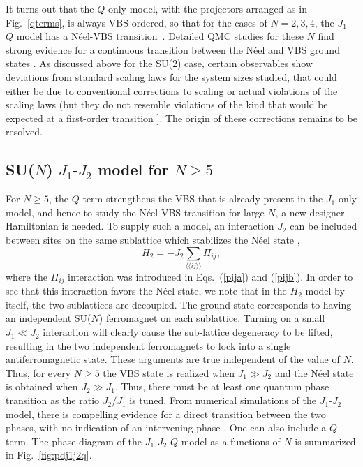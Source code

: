 \documentclass[range]{ar2e}
\begin{document}
It turns out that the $Q$-only model, with the projectors arranged as in Fig.~\ref{qterms}, is always VBS ordered, so that for the cases of $N=2,3,4$, 
the $J_1$-$Q$ model has a N\'eel-VBS transition~\cite{Sandvik07,lou2009:sun}. Detailed QMC studies for these $N$ find strong evidence for a 
continuous transition between the N\'eel and VBS ground states \cite{melko2008:jq,kaul2011:su34,banerjee2010:log,banerjee2010:su3}. 
As discussed above for the SU($2$) case, certain observables show deviations from standard scaling laws for the system sizes studied, that could either 
be due to conventional corrections to scaling or actual violations of the scaling laws (but they do not resemble violations of the kind that would be 
expected at a first-order transition \cite{Sandvik10c}]. The origin of these corrections remains to be resolved.

\subsection{SU($N$) $J_1$-$J_2$ model for $N\geq 5$}
\label{ss:j1j2N}

For $N\geq 5$, the $Q$ term strengthens the VBS that is already present in the $J_1$ only model, and hence to study the N\'eel-VBS transition 
for large-$N$, a new designer Hamiltonian is needed. To supply such a model, an interaction $J_2$ can be included between sites on the same sublattice 
which stabilizes the N\'eel state \cite{kaul2011:j1j2},
\begin{equation}
H_{2}= -J_2 \sum_{\langle\langle ij\rangle\rangle} \Pi_{ij},
\end{equation}
where the $\Pi_{ij}$ interaction was introduced in Eqs.~(\ref{pija}) and (\ref{pijb}).
In order to see that this interaction favors the N\'eel state, we note that in the $H_{2}$ model by itself, the two sublattices 
are decoupled. The ground state corresponds to having an independent SU($N$) ferromagnet on each sublattice. Turning on a small $J_1\ll J_2$ 
interaction will clearly cause the sub-lattice degeneracy to be lifted, resulting in the two independent ferromagnets to lock into a single
antiferromagnetic state. These arguments are true independent of the value of $N$. Thus, for every $N\geq 5$ the VBS state is realized when 
$J_1\gg J_2$ and the N\'eel state is obtained when $J_2 \gg J_1$. Thus, there must be at least one quantum phase transition as the ratio
$J_2/J_1$ is tuned. From numerical simulations of the $J_1$-$J_2$ model, there is compelling evidence for a direct transition between the two 
phases, with no indication of an intervening phase \cite{kaul2011:j1j2}. One can also include a $Q$ term. The phase diagram of the $J_1$-$J_2$-$Q$ model as a functions 
of $N$ is summarized in Fig.~\ref{fig:pdj1j2q}.
\end{document}
